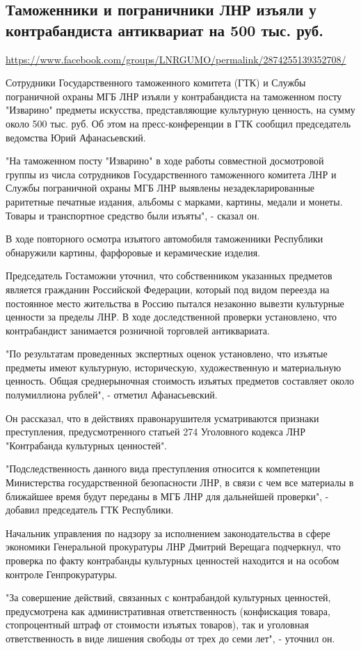  
 
\subsection{Таможенники и пограничники ЛНР изъяли у контрабандиста антиквариат на 500 тыс. руб.}
\url{https://www.facebook.com/groups/LNRGUMO/permalink/2874255139352708/}

Сотрудники Государственного таможенного комитета (ГТК) и Службы пограничной
охраны МГБ ЛНР изъяли у контрабандиста на таможенном посту "Изварино" предметы
искусства, представляющие культурную ценность, на сумму около 500 тыс. руб. Об
этом на пресс-конференции в ГТК сообщил председатель ведомства Юрий
Афанасьевский.

"На таможенном посту "Изварино" в ходе работы совместной досмотровой группы из
числа сотрудников Государственного таможенного комитета ЛНР и Службы
пограничной охраны МГБ ЛНР выявлены незадекларированные раритетные печатные
издания, альбомы с марками, картины, медали и монеты. Товары и транспортное
средство были изъяты", - сказал он.

В ходе повторного осмотра изъятого автомобиля таможенники Республики обнаружили
картины, фарфоровые и керамические изделия.

Председатель Гостаможни уточнил, что собственником указанных предметов является
гражданин Российской Федерации, который под видом переезда на постоянное место
жительства в Россию пытался незаконно вывезти культурные ценности за пределы
ЛНР. В ходе доследственной проверки установлено, что контрабандист занимается
розничной торговлей антиквариата.

"По результатам проведенных экспертных оценок установлено, что изъятые предметы
имеют культурную, историческую, художественную и материальную ценность. Общая
среднерыночная стоимость изъятых предметов составляет около полумиллиона
рублей", - отметил Афанасьевский.

Он рассказал, что в действиях правонарушителя усматриваются признаки
преступления, предусмотренного статьей 274 Уголовного кодекса ЛНР "Контрабанда
культурных ценностей".

"Подследственность данного вида преступления относится к компетенции
Министерства государственной безопасности ЛНР, в связи с чем все материалы в
ближайшее время будут переданы в МГБ ЛНР для дальнейшей проверки", - добавил
председатель ГТК Республики.

Начальник управления по надзору за исполнением законодательства в сфере
экономики Генеральной прокуратуры ЛНР Дмитрий Верещага подчеркнул, что проверка
по факту контрабанды культурных ценностей находится и на особом контроле
Генпрокуратуры.

"За совершение действий, связанных с контрабандой культурных ценностей,
предусмотрена как административная ответственность (конфискация товара,
стопроцентный штраф от стоимости изъятых товаров), так и уголовная
ответственность в виде лишения свободы от трех до семи лет", - уточнил он.

  
